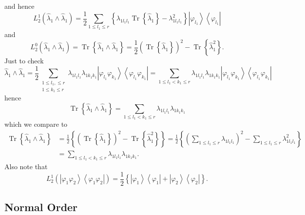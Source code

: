 \documentclass[aps,preprint]{revtex4}%
\begin{document}
and hence%
\[
L_{2}^{1}\left(  \hat{\lambda}_{1}\wedge\hat{\lambda}_{1}\right)  =\frac{1}%
{2}\sum_{1\leq l_{1}\leq r}\left\{  \lambda_{1l_{1}l_{1}}\operatorname*{Tr}%
\left\{  \hat{\lambda}_{1}\right\}  -\lambda_{1l_{1}l_{1}}^{2}\right\}
\left\vert \varphi_{l_{1}}\right\rangle \left\langle \varphi_{l_{1}%
}\right\vert
\]
and
\[
L_{2}^{0}\left(  \hat{\lambda}_{1}\wedge\hat{\lambda}_{1}\right)
=\operatorname*{Tr}\left\{  \hat{\lambda}_{1}\wedge\hat{\lambda}_{1}\right\}
=\frac{1}{2}\left(  \operatorname*{Tr}\left\{  \hat{\lambda}_{1}\right\}
\right)  ^{2}-\operatorname*{Tr}\left\{  \hat{\lambda}_{1}^{2}\right\}  .
\]
Just to check
\[
\hat{\lambda}_{1}\wedge\hat{\lambda}_{1}=\frac{1}{2}\sum_{\substack{1\leq
l_{1},\leq r\\1\leq k_{1}\leq r}}\lambda_{1l_{1}l_{1}}\lambda_{1k_{1}k_{1}%
}\left\vert \varphi_{l_{1}}\varphi_{k_{1}}\right\rangle \left\langle
\varphi_{l_{1}}\varphi_{k_{1}}\right\vert =\sum_{1\leq l_{1}<k_{1}\leq
r}\lambda_{1l_{1}l_{1}}\lambda_{1k_{1}k_{1}}\left\vert \varphi_{l_{1}}%
\varphi_{k_{1}}\right\rangle \left\langle \varphi_{l_{1}}\varphi_{k_{1}%
}\right\vert
\]
hence%
\[
\operatorname*{Tr}\left\{  \hat{\lambda}_{1}\wedge\hat{\lambda}_{1}\right\}
=\sum_{1\leq l_{1}<k_{1}\leq r}\lambda_{1l_{1}l_{1}}\lambda_{1k_{1}k_{1}}%
\]
which we compare to
\begin{align*}
\operatorname*{Tr}\left\{  \hat{\lambda}_{1}\wedge\hat{\lambda}_{1}\right\}
&  =\frac{1}{2}\left\{  \left(  \operatorname*{Tr}\left\{  \hat{\lambda}%
_{1}\right\}  \right)  ^{2}-\operatorname*{Tr}\left\{  \hat{\lambda}_{1}%
^{2}\right\}  \right\}  =\frac{1}{2}\left\{  \left(  \sum_{1\leq l_{1}\leq
r}\lambda_{1l_{1}l_{1}}\right)  ^{2}-\sum_{1\leq l_{1}\leq r}\lambda
_{1l_{1}l_{1}}^{2}\right\} \\
&  =\sum_{1\leq l_{1}<k_{1}\leq r}\lambda_{1l_{1}l_{1}}\lambda_{1k_{1}k_{1}}.
\end{align*}
Also note that
\[
L_{2}^{1}\left(  \left\vert \varphi_{1}\varphi_{2}\right\rangle \left\langle
\varphi_{1}\varphi_{2}\right\vert \right)  =\frac{1}{2}\left\{  \left\vert
\varphi_{1}\right\rangle \left\langle \varphi_{1}\right\vert +\left\vert
\varphi_{2}\right\rangle \left\langle \varphi_{2}\right\vert \right\}  .
\]


\subsection{Normal Order}%
\end{document}
